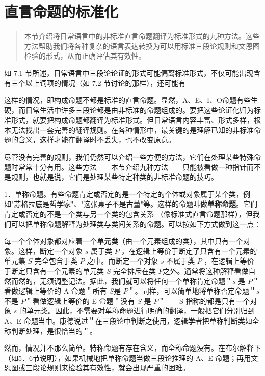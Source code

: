 \section{直言命题的标准化}

\begin{quotation}
本节介绍将日常语言中的非标准直言命题翻译为标准形式的九种方法。这些方法帮助我们将各种复杂的语言表达转换为可以用标准三段论规则和文恩图检验的形式，从而正确评估其有效性。
\end{quotation}

如 7.1 节所述，日常语言中三段论论证的形式可能偏离标准形式，不仅可能出现含有三个以上词项的情况（如 7.2 节讨论的那样），还可能有

这样的情况，即构成命题不都是标准的直言命题。显然，A、E、I、O命题有些生硬，而日常生活中许多三段论都是由非标准的命题组成的。要把这些论证化归为标准形式，就要把构成命题都翻译为标准形式。但日常语言内容丰富、形式多样，根本无法找出一套完善的翻译规则。在各种情形中，最关键的是理解已知的非标准命题的含义，这样才能在翻译时不丢失，也不改变原意。

尽管没有完善的规则，我们仍然可以介绍一些方便的方法，它们在处理某些特殊命题时常常十分有用。这些方法——本节介绍九种方法——只能被看做一种指针而不是规则，也就是说，它们是处理某些特定种类的非标准命题的技巧。

1．单称命题。有些命题肯定或否定的是一个特定的个体或对象属于某个类，例如"苏格拉底是哲学家"、"这张桌子不是古董"等。这样的命题叫做\textbf{单称命题}。它们肯定或否定的不是一个类与另一个类的包含关系 （像标准式直言命题那样），但我们可以把单称命题解释为处理类与类间关系的命题。可以按如下方式做到这一点：

每一个个体对象都对应着一个\textbf{单元类}（由一个元素组成的类），其中只有一个对象。这样，断定一个对象 $s$ 属于类 $P$ ，在逻辑上等价于断定了只含有一个元素的单元集 $S$ 完全包含于类 $P$ 之中。而断定一个对象 $s$ 不属于类 $P$ ，在逻辑上等价于断定只含有一个元素的单元类 $S$ 完全排斥在类 $P$之外。通常将这种解释看做自然而然的，无须调整记法。据此，我们就可以将任何一个单称肯定命题＂$s$ 是 $P$＂看做逻辑上等价的 A 命题＂所有 $S$是 $P$＂。同样，可以简单地将单称否定命题＂$s$ 不是 $P$＂看做逻辑上等价的 E 命题＂没有 $S$ 是 $P$＂——S 指称的都是只有一个对象 $s$ 的单元类。因此，不需要对单称命题进行明确的翻译，一般把它们分别归到 $\mathrm{A} 、 \mathrm{E}$ 命题当中。康德说过＂在三段论中判断之使用，逻辑学者把单称判断类如全称判断处理，是很恰当的＂\cite{kant1781}。

然而，情况并不那么简单。特称命题有存在含义，而全称命题没有。在布尔解释下（如5．6节说明），如果机械地把单称命题当做三段论推理的 A、E 命题；再用文恩图或三段论规则来检验其有效性，就会出现严重的困难。

